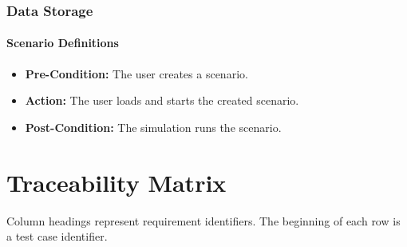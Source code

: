 \documentclass[titlepage]{article}
\newcommand{\testentry}[4]{
    \paragraph{#1}
    \begin{itemize}
        \item \textbf{Pre-Condition:} #2
        \item \textbf{Action:} #3
        \item \textbf{Post-Condition:} #4
    \end{itemize}
}
\begin{document}

\subsubsection{Data Storage%
  \label{data-storage}%
}
    \testentry{Scenario Definitions}{ 
        The user creates a scenario.
    }{
        The user loads and starts the created scenario.
    }{
        The simulation runs the scenario.
    }

\pagebreak
\section{Traceability Matrix%
  \label{Traceability Matrix}%
}

Column headings represent requirement identifiers. The beginning of each row is a test case identifier.
\vspace{5pt}
\end{document}
